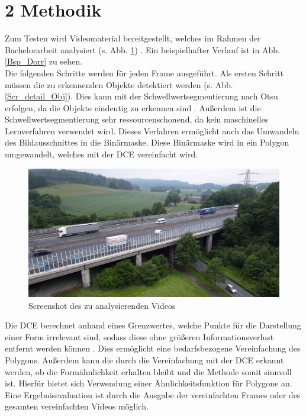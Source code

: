 \documentclass[a4paper,11pt,pdftex, parskip]{scrreprt}
\begin{document}
\section*{2 Methodik}{
Zum Testen wird Videomaterial bereitgestellt, welches im Rahmen der Bachelorarbeit analysiert (s. Abb. \ref{Scr_ges_Vid}) \citep{Metz2022}. Ein beispielhafter Verlauf ist in Abb. \ref{Bsp_Dorr} zu sehen. \\
Die folgenden Schritte werden für jeden Frame ausgeführt. 
Als ersten Schritt müssen die zu erkennenden Objekte detektiert werden (s. Abb. \ref{Scr_detail_Obj}). Dies kann mit der Schwellwertsegmentierung nach Otsu erfolgen, da die Objekte eindeutig zu erkennen sind \citep{Otsu1979}. Außerdem ist die Schwellwertsegmentierung sehr ressourcenschonend, da kein maschinelles Lernverfahren verwendet wird. Dieses Verfahren ermöglicht auch das Umwandeln des Bildausschnittes in die Binärmaske. Diese Binärmaske wird in ein Polygon umgewandelt, welches mit der DCE vereinfacht wird.

\begin{figure}[ht]
    \centering
    \includegraphics[scale=0.2, keepaspectratio]{images/screenshot_video_autobahn_yt.png}
    \caption[Screenshot des zu analysierenden Videos]{Screenshot des zu analysierenden Videos \citep{Metz2022}}
    \label{Scr_ges_Vid}
\end{figure}

Die DCE berechnet anhand eines Grenzwertes, welche Punkte für die Darstellung einer Form irrelevant sind, sodass diese ohne größeren Informationsverlust entfernt werden können \citep{Barkowsky2000}. Dies ermöglicht eine bedarfsbezogene Vereinfachung des Polygons. 
Außerdem kann die durch die Vereinfachung mit der DCE erkannt werden, ob die Formähnlichkeit erhalten bleibt und die Methode somit sinnvoll ist. Hierfür bietet sich Verwendung einer Ähnlichkeitsfunktion für Polygone an. \\
Eine Ergebnisevaluation ist durch die Ausgabe der vereinfachten Frames  oder des gesamten vereinfachten Videos möglich. \\
 

}
\end{document}
